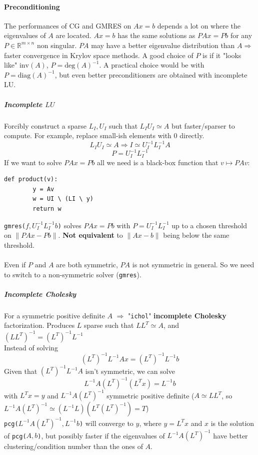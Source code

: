 \documentclass[10pt]{report}
\begin{document}
\paragraph{Preconditioning} The performances of CG and GMRES on $Ax=b$ depends a lot on where the eigenvalues of $A$ are located. $Ax=b$ has the same solutions as $PAx = Pb$ for any $P\in \mathbb{R}^{m\times n}$ non singular. $PA$ may have a better eigenvalue distribution than $A\Rightarrow$ faster convergence in Krylov space methods. A good choice of $P$ is if it "looks like" $\text{inv}(A)$, $P = \text{deg}(A)^{-1}$. A practical choice would be with $P=\text{diag}(A)^{-1}$, but even better preconditioners are obtained with incomplete LU.
\subparagraph{Incomplete $LU$} Forcibly construct a sparse $L_I, U_I$ such that $L_IU_I\simeq A$ but faster/sparser to compute. For example, replace small-ish elements with 0 directly.
$$L_IU_I\simeq A \Rightarrow I \simeq U_I^{-1}L_I^{-1}A$$ $$P = U_I^{-1}L_I^{-1}$$
If we want to solve $PAx=Pb$ all we need is a black-box function that $v\mapsto PAv$:
\begin{lstlisting}[style=myPython]
	def product(v):
		y = Av
		w = UI \ (LI \ y)
		return w
\end{lstlisting}
\texttt{gmres($f, U_I^{-1}L_I^{-1}b$)} solves $PAx=Pb$ with $P = U_I^{-1}L_I^{-1}$ up to a chosen threshold on $\|PAx-Pb\|$. \textbf{Not equivalent} to $\|Ax-b\|$ being below the same threshold.\\\\
Even if $P$ and $A$ are both symmetric, $PA$ is not symmetric in general. So we need to switch to a non-symmetric solver (\texttt{gmres}).
\subparagraph{Incomplete Cholesky} For a symmetric positive definite $A$ $\Rightarrow$ "\texttt{ichol}" \textbf{incomplete Cholesky} factorization. Produces $L$ sparse such that $LL^T\simeq A$, and $(LL^T)^{-1}=(L^T)^{-1}L^{-1}$\\
Instead of solving $$(L^T)^{-1}L^{-1}Ax = (L^T)^{-1}L^{-1}b$$ Given that $(L^T)^{-1}L^{-1}A$ isn't symmetric, we can solve $$L^{-1}A(L^T)^{-1}(L^Tx) = L^{-1}b$$ with $L^Tx=y$ and $L^{-1}A(L^T)^{-1}$ symmetric positive definite ($A\simeq LL^T$, so $L^{-1}A(L^T)^{-1}\simeq(L^{-1}L)(L^T(L^T)^{-1}) = T$)\\
\texttt{pcg($L^{-1}A(L^T)^{-1},L^{-1}b$)} will converge to $y$, where $y=L^Tx$ and $x$ is the solution of \texttt{pcg($A,b$)}, but possibly faster if the eigenvalues of $L^{-1}A(L^T)^{-1}$ have better clustering/condition number than the ones of $A$.
\end{document}
